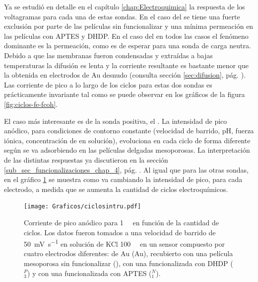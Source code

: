 	Ya se estudió en detalle en el capítulo \ref{chap:Electroquimica} la respuesta de los voltagramas para cada una de estas sondas. En el caso del \fe\space se tiene una fuerte exclusión por parte de las películas sin funcionalizar y una mínima permeación en las películas con APTES y DHDP. 
	En el caso del \fc\space en todos las casos el fenómeno dominante es la permeación, como es de esperar para una sonda de carga neutra. Debido a que las membranas fueron condensadas y extraídas a bajas temperaturas la difusión es lenta y la corriente resultante es bastante menor que la obtenida en electrodos de Au desnudo (consulta sección \ref{sec:difusion}, pág. \pageref{sec:difusion}). Las corriente de pico a lo largo de los ciclos para estas dos sondas es prácticamente invariante tal como se puede observar en los gráficos de la figura \ref{fig:ciclos-fe-fcoh}.

	El caso más interesante es de la sonda positiva, el \ru. La intensidad de pico anódico, para condiciones de contorno constante (velocidad de barrido, pH, fuerza iónica, concentración de \ru\space en solución), evoluciona en cada ciclo de forma diferente según se va adsorbiendo en las películas delgadas mesoporosas. La interpretación de las distintas respuestas ya discutieron en la sección \ref{sub_sec_funcionalizaciones_chap_4}, pág. \pageref{sub_sec_funcionalizaciones_chap_4}. Al igual que para las otras sondas, en el gráfico \ref{fig:ruciclos}  se muestra como va cambiando la intensidad de pico, para cada electrodo, a medida que se aumenta la cantidad de ciclos electroquímicos. 

			\begin{figure}[ht!]
		 	       	\begin{center}
		 	       	\texttt{[image: Graficos/ciclosintru.pdf]}
		        	\caption[Corriente de pico de \ru\space en función del número de ciclos]{Corriente de pico anódico para \ru\space \SI{1}{\milli\Molar} en función de la cantidad de ciclos. Los datos fueron tomados a una velocidad de barrido de \SI{50}{\milli\volt\per\second} en solución de KCl \SI{100}{\milli\Molar} en un sensor compuesto por cuatro electrodos diferentes: de Au (Au), recubierto con una película mesoporosa sin funcionalizar (\pdmZ), con una funcionalizada con DHDP (\pdmZ$^P_3$) y con una funcionalizada con APTES (\pdmZ$^N_1$).}
		         	\label{fig:ruciclos}
		         	\end{center}
		     		\end{figure}
	
